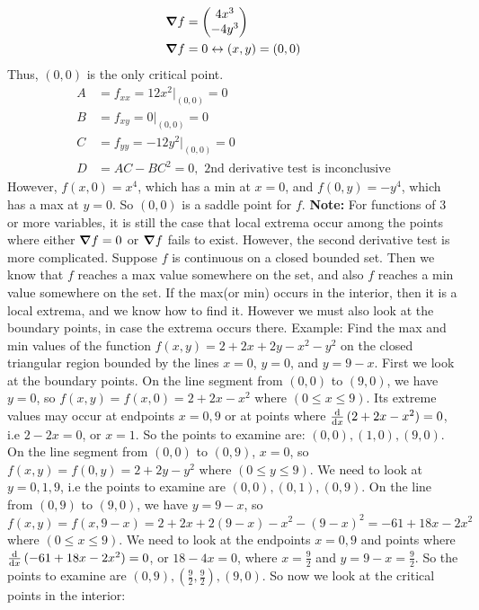 \documentclass{article}
\newcommand{\n}{\leavevmode \newline} %
\newcommand{\nn}{\leavevmode \newline \newline} %
\numberwithin{equation}{subsection} %
\begin{document}
\begin{equation}
    \begin{split}
        \grad f &=
        \begin{pmatrix}
            4x^3 \\ -4y^3
        \end{pmatrix}
        \\
        \grad f &= 0 \leftrightarrow (x,y)=(0,0)
    \end{split}
\end{equation}
Thus, $(0,0)$ is the only critical point.
\begin{equation}
    \begin{split}
        A &= f_{xx} = 12x^2|_{(0,0)} = 0 \\
        B &= f_{xy} = 0|_{(0,0)} = 0 \\
        C &= f_{yy} = -12y^2|_{(0,0)} = 0\\
        D &= AC-BC^2 = 0, \text{ 2nd derivative test is inconclusive}
    \end{split}
\end{equation}
However, $f(x,0)=x^4$, which has a min at $x=0$, and $f(0,y)=-y^4$, which has a max at $y=0$. So $(0,0)$ is a saddle point for $f$.
\nn
\textbf{Note: } For functions of 3 or more variables, it is still the case that local extrema occur among the points where either $\grad f = 0$ or $\grad f$ fails to exist. However, the second derivative test is more complicated. Suppose $f$ is continuous on a closed bounded set. Then we know that $f$ reaches a max value somewhere on the set, and also $f$ reaches a min value somewhere on the set. If the max(or min) occurs in the interior, then it is a local extrema, and we know how to find it. However we must also look at the boundary points, in case the extrema occurs there.
\n
Example:  Find the max and min values of the function $f(x,y)=2+2x+2y-x^2-y^2$ on the closed triangular region bounded by the lines $x=0$, $y=0$, and $y=9-x$. First we look at the boundary points. On the line segment from $(0,0)$ to $(9,0)$, we have $y=0$, so $f(x,y)=f(x,0)=2+2x-x^2$ where $(0\leq x\leq 9)$. Its extreme values may occur at endpoints $x=0,9$ or at points where $\dv{x}\,(2+2x-x^2) = 0$, i.e $2-2x=0$, or $x = 1$. So the points to examine are: $(0,0) , (1,0) , (9,0)$. On the line segment from $(0,0)$ to $(0,9)$, $x=0$, so $f(x,y)=f(0,y)=2+2y-y^2$ where $(0 \leq y \leq 9)$. We need to look at $y=0,1,9$, i.e the points to examine are $(0,0), (0,1), (0,9)$. On the line from $(0,9)$ to $(9,0)$, we have $y=9-x$, so $f(x,y)=f(x,9-x)= 2+2x+2(9-x)-x^2-(9-x)^2 = -61+18x-2x^2$ where $(0 \leq x \leq 9)$. We need to look at the endpoints $x=0,9$ and points where $\dv{x}\,(-61+18x-2x^2) = 0$, or $18-4x=0$, where $x=\frac{9}{2}$ and $y=9-x=\frac{9}{2}$. So the points to examine are $(0,9), (\frac{9}{2}, \frac{9}{2}), (9,0)$. So now we look at the critical points in the interior: 
\end{document}
